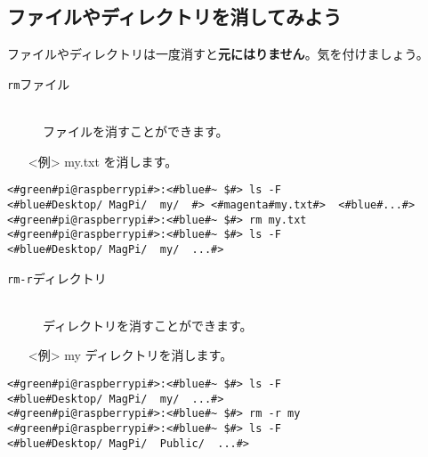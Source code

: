 \newpage
\subsection{ファイルやディレクトリを消してみよう}
ファイルやディレクトリは一度消すと\textbf{元にはりません}。気を付けましょう。
\begin{description}
\item[\texttt{rm}\textvisiblespace ファイル]\mbox{}\\
ファイルを消すことができます。
\end{description}
\begin{itemize}
\item[<例>]my.txt を消します。
\end{itemize}
\begin{lstlisting}[caption=cpの例, label=cp]
<#green#pi@raspberrypi#>:<#blue#~ $#> ls -F
<#blue#Desktop/	MagPi/	my/	 #>	<#magenta#my.txt#>	<#blue#...#>
<#green#pi@raspberrypi#>:<#blue#~ $#> rm my.txt
<#green#pi@raspberrypi#>:<#blue#~ $#> ls -F
<#blue#Desktop/	MagPi/	my/	 ...#>
\end{lstlisting}
\begin{description}
\item[\texttt{rm}\textvisiblespace \texttt{-r}\textvisiblespace ディレクトリ]\mbox{}\\
ディレクトリを消すことができます。
\end{description}
\begin{itemize}
\item[<例>]my ディレクトリを消します。
\end{itemize}
\begin{lstlisting}[caption=cp -rの例, label=cp-R]
<#green#pi@raspberrypi#>:<#blue#~ $#> ls -F
<#blue#Desktop/	MagPi/	my/	 ...#>
<#green#pi@raspberrypi#>:<#blue#~ $#> rm -r my
<#green#pi@raspberrypi#>:<#blue#~ $#> ls -F
<#blue#Desktop/	MagPi/	Public/	 ...#>
\end{lstlisting}
\begin{tcolorbox}[title=\useOmetoi]
\begin{enumerate}
\end{enumerate}
\end{tcolorbox}
